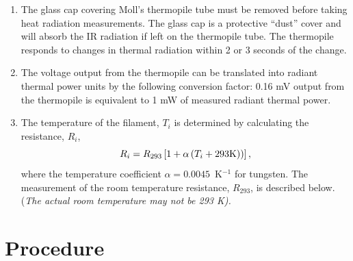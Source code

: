 \documentclass{article}
\begin{document}
\begin{enumerate}
\item The glass cap covering Moll's thermopile tube must
be removed before taking heat radiation measurements. The glass cap is
a protective ``dust'' cover and will
absorb the IR radiation if left on the thermopile tube. The thermopile
responds to changes in thermal radiation within 2 or 3 seconds of the
change.


\item The voltage output from the thermopile can be translated into radiant
thermal power units by the following conversion factor: 0.16 mV output
from the thermopile is equivalent to 1 mW of measured radiant thermal
power.

\item The temperature of the filament, $T_i$ is determined by calculating the resistance, $R_i$,
\begin{equation}
R_i = R_{293} \left[ 1 + \alpha \left(T_i + 293 {\rm K} )\right)\right],
\label{eq-filamenttemp}
\end{equation}
where the temperature coefficient $\alpha = 0.0045$~K$^{-1}$ for tungsten.  The measurement of the room temperature resistance, $R_{293}$, is described below. (\em The actual room temperature may not be 293 K).   

\end{enumerate}

\section{Procedure }
\end{document}

